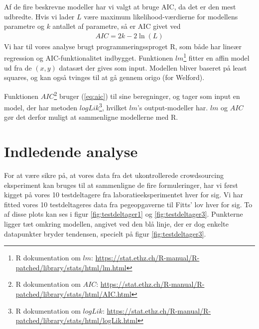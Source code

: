 Af de fire beskrevne modeller har vi valgt at bruge AIC, da det er den mest udbredte. Hvis vi lader $L$ være maximum likelihood-værdierne for modellens parametre og $k$ antallet af parametre, så er AIC givet ved
\begin{align}
AIC = 2k - 2\ln(L) \label{eq:aic}
\end{align}
Vi har til vores analyse brugt programmeringssproget R, som både har lineær regression og AIC-funktionalitet indbygget. Funktionen $lm$\footnote{R dokumentation om $lm$: \url{https://stat.ethz.ch/R-manual/R-patched/library/stats/html/lm.html}} fitter en affin model ud fra de $(x,y)$ datasæt der gives som input. Modellen bliver baseret på least squares, og kan også tvinges til at gå gennem origo (for Welford).

Funktionen $AIC$\footnote{R dokumentation om $AIC$: \url{https://stat.ethz.ch/R-manual/R-patched/library/stats/html/AIC.html}} bruger (\ref{eq:aic}) til sine beregninger, og tager som input en model, der har metoden $logLik$\footnote{R dokumentation om $logLik$: \url{https://stat.ethz.ch/R-manual/R-patched/library/stats/html/logLik.html}}, hvilket $lm$'s output-modeller har. $lm$ og $AIC$ gør det derfor muligt at sammenligne modellerne med R.

\section*{Indledende analyse}
For at være sikre på, at vores data fra det ukontrollerede crowdsourcing eksperiment kan bruges til at sammenligne de fire formuleringer, har vi først kigget på vores 10 testdeltagere fra laboratieeksperimentet hver for sig. Vi har fitted vores 10 testdeltageres data fra pegeopgaverne til Fitts' lov hver for sig. To af disse plots kan ses i figur \ref{fig:testdeltager1} og \ref{fig:testdeltager3}.  Punkterne ligger tæt omkring modellen, angivet ved den blå linje, der er dog enkelte datapunkter bryder tendensen, specielt på figur \ref{fig:testdeltager3}.

